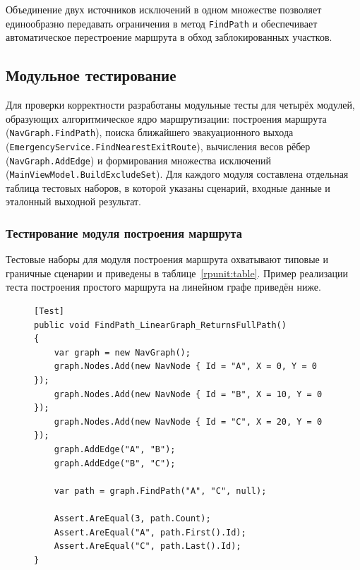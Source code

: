 Объединение двух источников исключений в одном множестве позволяет единообразно передавать ограничения в метод \texttt{FindPath} и обеспечивает автоматическое перестроение маршрута в обход заблокированных участков.

\subsection{Модульное тестирование}

Для проверки корректности разработаны модульные тесты для четырёх модулей, образующих алгоритмическое ядро маршрутизации: построения маршрута (\texttt{NavGraph.FindPath}), поиска ближайшего эвакуационного выхода (\texttt{EmergencyService.FindNearestExitRoute}), вычисления весов рёбер (\texttt{NavGraph.AddEdge}) и формирования множества исключений (\texttt{MainViewModel.BuildExcludeSet}). Для каждого модуля составлена отдельная таблица тестовых наборов, в которой указаны сценарий, входные данные и эталонный выходной результат.

\subsubsection{Тестирование модуля построения маршрута}

Тестовые наборы для модуля построения маршрута охватывают типовые и граничные сценарии и приведены в таблице~\ref{rpunit:table}. Пример реализации теста построения простого маршрута на линейном графе приведён ниже.

\begin{figure}[H]
\begin{lstlisting}[language={[Sharp]C}]
[Test]
public void FindPath_LinearGraph_ReturnsFullPath()
{
    var graph = new NavGraph();
    graph.Nodes.Add(new NavNode { Id = "A", X = 0, Y = 0 });
    graph.Nodes.Add(new NavNode { Id = "B", X = 10, Y = 0 });
    graph.Nodes.Add(new NavNode { Id = "C", X = 20, Y = 0 });
    graph.AddEdge("A", "B");
    graph.AddEdge("B", "C");

    var path = graph.FindPath("A", "C", null);

    Assert.AreEqual(3, path.Count);
    Assert.AreEqual("A", path.First().Id);
    Assert.AreEqual("C", path.Last().Id);
}
\end{lstlisting}
\end{figure}

